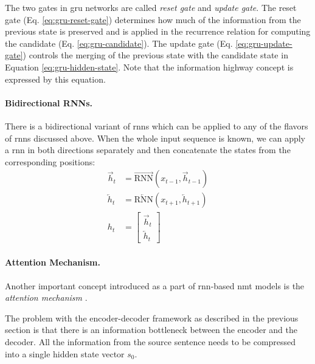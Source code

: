 The two gates in \gls{gru} networks are called \emph{reset gate} and
\emph{update gate}.  The reset gate (Eq. \ref{eq:gru-reset-gate}) determines how
much of the information from the previous state is preserved and is applied in
the recurrence relation for computing the candidate
(Eq. \ref{eq:gru-candidate}). The update gate (Eq.  \ref{eq:gru-update-gate})
controls the merging of the previous state with the candidate state in Equation
\ref{eq:gru-hidden-state}. Note that the information highway concept is
expressed by this equation.

\paragraph{Bidirectional RNNs.} There is a bidirectional variant of \glspl{rnn}
which can be applied to any of the flavors of \glspl{rnn} discussed above. When
the whole input sequence is known, we can apply a \gls{rnn} in both directions
separately and then concatenate the states from the corresponding positions:
%
\begin{align}
  \overrightarrow{h}_t &= \overrightarrow{\mathrm{RNN}}(x_{t-1}, \overrightarrow{h}_{t-1}) \\
  \overleftarrow{h}_t &= \overleftarrow{\mathrm{RNN}}(x_{t+1}, \overleftarrow{h}_{t+1}) \\
  h_t &= \left[ \begin{matrix} \overrightarrow{h}_t \\ \overleftarrow{h}_t \end{matrix} \right]
\end{align}

\paragraph{Attention Mechanism.} Another important concept introduced as a part
of \gls{rnn}-based \gls{nmt} models is the \emph{attention mechanism}
\citep{bahdanau2014neural,luong2015effective}.

The problem with the encoder-decoder framework as described in the previous
section is that there is an information bottleneck between the encoder and the
decoder. All the information from the source sentence needs to be compressed
into a single hidden state vector $s_0$.

